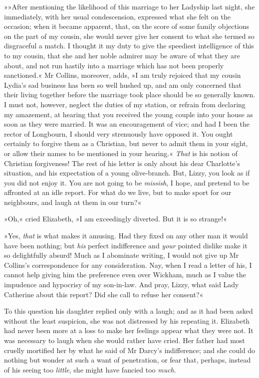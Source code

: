 »»After mentioning the likelihood of this marriage to her Ladyship last night, she immediately, with her usual condescension, expressed what she felt on the occasion; when it became apparent, that, on the score of some family objections on the part of my cousin, she would never give her consent to what she termed so disgraceful a match. I thought it my duty to give the speediest intelligence of this to my cousin, that she and her noble admirer may be aware of what they are about, and not run hastily into a marriage which has not been properly sanctioned.« Mr Collins, moreover, adds, »I am truly rejoiced that my cousin Lydia's sad business has been so well hushed up, and am only concerned that their living together before the marriage took place should be so generally known. I must not, however, neglect the duties of my station, or refrain from declaring my amazement, at hearing that you received the young couple into your house as soon as they were married. It was an encouragement of vice; and had I been the rector of Longbourn, I should very strenuously have opposed it. You ought certainly to forgive them as a Christian, but never to admit them in your sight, or allow their names to be mentioned in your hearing.« \textit{That} is his notion of Christian forgiveness! The rest of his letter is only about his dear Charlotte's situation, and his expectation of a young olive-branch. But, Lizzy, you look as if you did not enjoy it. You are not going to be \textit{missish}, I hope, and pretend to be affronted at an idle report. For what do we live, but to make sport for our neighbours, and laugh at them in our turn?«

»Oh,« cried Elizabeth, »I am exceedingly diverted. But it is so strange!«

»Yes, \textit{that} is what makes it amusing. Had they fixed on any other man it would have been nothing; but \textit{his} perfect indifference and \textit{your} pointed dislike make it so delightfully absurd! Much as I abominate writing, I would not give up Mr Collins's correspondence for any consideration. Nay, when I read a letter of his, I cannot help giving him the preference even over Wickham, much as I value the impudence and hypocrisy of my son-in-law. And pray, Lizzy, what said Lady Catherine about this report? Did she call to refuse her consent?«

To this question his daughter replied only with a laugh; and as it had been asked without the least suspicion, she was not distressed by his repeating it. Elizabeth had never been more at a loss to make her feelings appear what they were not. It was necessary to laugh when she would rather have cried. Her father had most cruelly mortified her by what he said of Mr Darcy's indifference; and she could do nothing but wonder at such a want of penetration, or fear that, perhaps, instead of his seeing too \textit{little}, she might have fancied too \textit{much}.